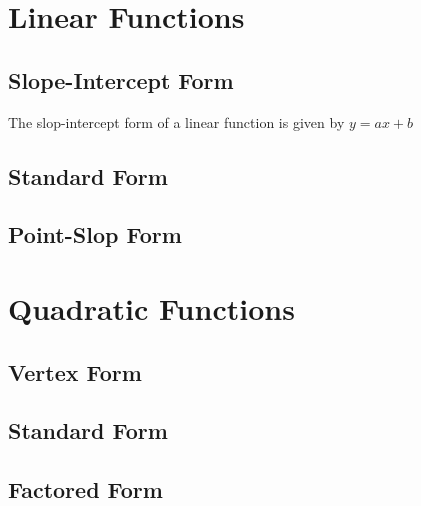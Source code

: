 \documentclass[11pt]{article}
\begin{document}
\section{Linear Functions}
	\subsection{Slope-Intercept Form}
	The slop-intercept form of a linear function is given by $y=ax+b$
	\subsection{Standard Form}
	\subsection{Point-Slop Form}
	
\section{Quadratic Functions}
	\subsection{Vertex Form}
	\subsection{Standard Form}
	\subsection{Factored Form}
\end{document}
